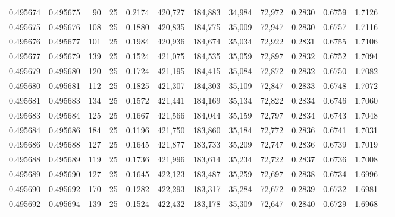 \begin{tabular}{rrrrrrrrrrrrr}
0.495674 & 0.495675 &    90 &  25 &                                     0.2174 & 420,727 & 184,883 &  34,984 &  72,972 & 0.2830 & 0.6759 & 1.7126 \\
0.495675 & 0.495676 &   108 &  25 &                                     0.1880 & 420,835 & 184,775 &  35,009 &  72,947 & 0.2830 & 0.6757 & 1.7116 \\
0.495676 & 0.495677 &   101 &  25 &                                     0.1984 & 420,936 & 184,674 &  35,034 &  72,922 & 0.2831 & 0.6755 & 1.7106 \\
0.495677 & 0.495679 &   139 &  25 &                                     0.1524 & 421,075 & 184,535 &  35,059 &  72,897 & 0.2832 & 0.6752 & 1.7094 \\
0.495679 & 0.495680 &   120 &  25 &                                     0.1724 & 421,195 & 184,415 &  35,084 &  72,872 & 0.2832 & 0.6750 & 1.7082 \\
0.495680 & 0.495681 &   112 &  25 &                                     0.1825 & 421,307 & 184,303 &  35,109 &  72,847 & 0.2833 & 0.6748 & 1.7072 \\
0.495681 & 0.495683 &   134 &  25 &                                     0.1572 & 421,441 & 184,169 &  35,134 &  72,822 & 0.2834 & 0.6746 & 1.7060 \\
0.495683 & 0.495684 &   125 &  25 &                                     0.1667 & 421,566 & 184,044 &  35,159 &  72,797 & 0.2834 & 0.6743 & 1.7048 \\
0.495684 & 0.495686 &   184 &  25 &                                     0.1196 & 421,750 & 183,860 &  35,184 &  72,772 & 0.2836 & 0.6741 & 1.7031 \\
0.495686 & 0.495688 &   127 &  25 &                                     0.1645 & 421,877 & 183,733 &  35,209 &  72,747 & 0.2836 & 0.6739 & 1.7019 \\
0.495688 & 0.495689 &   119 &  25 &                                     0.1736 & 421,996 & 183,614 &  35,234 &  72,722 & 0.2837 & 0.6736 & 1.7008 \\
0.495689 & 0.495690 &   127 &  25 &                                     0.1645 & 422,123 & 183,487 &  35,259 &  72,697 & 0.2838 & 0.6734 & 1.6996 \\
0.495690 & 0.495692 &   170 &  25 &                                     0.1282 & 422,293 & 183,317 &  35,284 &  72,672 & 0.2839 & 0.6732 & 1.6981 \\
0.495692 & 0.495694 &   139 &  25 &                                     0.1524 & 422,432 & 183,178 &  35,309 &  72,647 & 0.2840 & 0.6729 & 1.6968 \\

\end{tabular}
